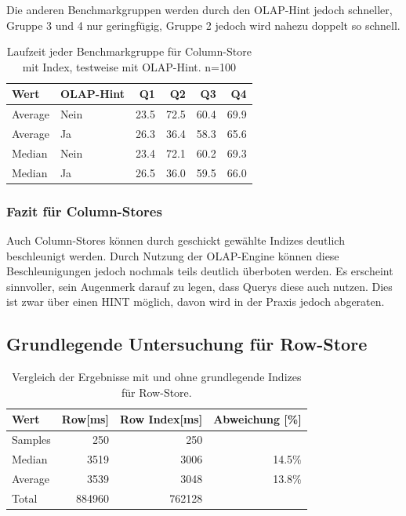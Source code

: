 Die anderen Benchmarkgruppen werden durch den OLAP-Hint jedoch schneller, Gruppe 3 und 4 nur geringfügig, Gruppe 2 jedoch wird nahezu doppelt so schnell.
\begin{table}[H]
    \centering
    \begin{tabularx}{\textwidth}{lXrrrr}
    \toprule
	Wert        &	OLAP-Hint & Q1 	    &	Q2 	    &	Q3	    &	Q4 \\
    \toprule
    Average	    & Nein        &	23.5	&	72.5	&	60.4	&	69.9 \\
    Average     & Ja	      &	26.3	&	36.4	&	58.3	&	65.6 \\
    \midrule
    Median	    & Nein        &	23.4	&	72.1	&	60.2	&	69.3 \\
    Median	    & Ja          &	26.5	&	36.0	&	59.5	&	66.0 \\
    \bottomrule
    \end{tabularx}
	\caption{Laufzeit jeder Benchmarkgruppe für Column-Store mit Index, testweise mit OLAP-Hint. n=100}
    \label{tab:olap_bench}
\end{table}

\subsubsection{Fazit für Column-Stores}
Auch Column-Stores können durch geschickt gewählte Indizes deutlich beschleunigt werden. Durch Nutzung der OLAP-Engine können diese Beschleunigungen jedoch nochmals teils deutlich überboten werden. 
Es erscheint sinnvoller, sein Augenmerk darauf zu legen, dass Querys diese auch nutzen. Dies ist zwar über einen HINT möglich, davon wird in der Praxis jedoch abgeraten.

\subsection{Grundlegende Untersuchung für Row-Store}

\begin{table}[H]
    \begin{tabularx}{\textwidth}{lrrr}
        \toprule
        Wert                & Row[ms] & Row Index[ms]   & Abweichung [\%]\\
        \toprule
        Samples             & 250      & 250            &       \\
        \midrule
        Median              & 3519     & 3006           &  14.5\%     \\
        Average             & 3539     & 3048           &  13.8\%     \\
        Total               & 884960   & 762128         &       \\ 
        \bottomrule
    \end{tabularx}
\caption{Vergleich der Ergebnisse mit und ohne grundlegende Indizes für Row-Store.}
\label{tab:basic_index_row}
\end{table}





